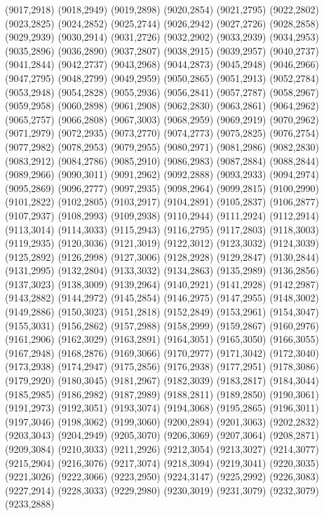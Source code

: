 (9017,2918)
(9018,2949)
(9019,2898)
(9020,2854)
(9021,2795)
(9022,2802)
(9023,2825)
(9024,2852)
(9025,2744)
(9026,2942)
(9027,2726)
(9028,2858)
(9029,2939)
(9030,2914)
(9031,2726)
(9032,2902)
(9033,2939)
(9034,2953)
(9035,2896)
(9036,2890)
(9037,2807)
(9038,2915)
(9039,2957)
(9040,2737)
(9041,2844)
(9042,2737)
(9043,2968)
(9044,2873)
(9045,2948)
(9046,2966)
(9047,2795)
(9048,2799)
(9049,2959)
(9050,2865)
(9051,2913)
(9052,2784)
(9053,2948)
(9054,2828)
(9055,2936)
(9056,2841)
(9057,2787)
(9058,2967)
(9059,2958)
(9060,2898)
(9061,2908)
(9062,2830)
(9063,2861)
(9064,2962)
(9065,2757)
(9066,2808)
(9067,3003)
(9068,2959)
(9069,2919)
(9070,2962)
(9071,2979)
(9072,2935)
(9073,2770)
(9074,2773)
(9075,2825)
(9076,2754)
(9077,2982)
(9078,2953)
(9079,2955)
(9080,2971)
(9081,2986)
(9082,2830)
(9083,2912)
(9084,2786)
(9085,2910)
(9086,2983)
(9087,2884)
(9088,2844)
(9089,2966)
(9090,3011)
(9091,2962)
(9092,2888)
(9093,2933)
(9094,2974)
(9095,2869)
(9096,2777)
(9097,2935)
(9098,2964)
(9099,2815)
(9100,2990)
(9101,2822)
(9102,2805)
(9103,2917)
(9104,2891)
(9105,2837)
(9106,2877)
(9107,2937)
(9108,2993)
(9109,2938)
(9110,2944)
(9111,2924)
(9112,2914)
(9113,3014)
(9114,3033)
(9115,2943)
(9116,2795)
(9117,2803)
(9118,3003)
(9119,2935)
(9120,3036)
(9121,3019)
(9122,3012)
(9123,3032)
(9124,3039)
(9125,2892)
(9126,2998)
(9127,3006)
(9128,2928)
(9129,2847)
(9130,2844)
(9131,2995)
(9132,2804)
(9133,3032)
(9134,2863)
(9135,2989)
(9136,2856)
(9137,3023)
(9138,3009)
(9139,2964)
(9140,2921)
(9141,2928)
(9142,2987)
(9143,2882)
(9144,2972)
(9145,2854)
(9146,2975)
(9147,2955)
(9148,3002)
(9149,2886)
(9150,3023)
(9151,2818)
(9152,2849)
(9153,2961)
(9154,3047)
(9155,3031)
(9156,2862)
(9157,2988)
(9158,2999)
(9159,2867)
(9160,2976)
(9161,2906)
(9162,3029)
(9163,2891)
(9164,3051)
(9165,3050)
(9166,3055)
(9167,2948)
(9168,2876)
(9169,3066)
(9170,2977)
(9171,3042)
(9172,3040)
(9173,2938)
(9174,2947)
(9175,2856)
(9176,2938)
(9177,2951)
(9178,3086)
(9179,2920)
(9180,3045)
(9181,2967)
(9182,3039)
(9183,2817)
(9184,3044)
(9185,2985)
(9186,2982)
(9187,2989)
(9188,2811)
(9189,2850)
(9190,3061)
(9191,2973)
(9192,3051)
(9193,3074)
(9194,3068)
(9195,2865)
(9196,3011)
(9197,3046)
(9198,3062)
(9199,3060)
(9200,2894)
(9201,3063)
(9202,2832)
(9203,3043)
(9204,2949)
(9205,3070)
(9206,3069)
(9207,3064)
(9208,2871)
(9209,3084)
(9210,3033)
(9211,2926)
(9212,3054)
(9213,3027)
(9214,3077)
(9215,2904)
(9216,3076)
(9217,3074)
(9218,3094)
(9219,3041)
(9220,3035)
(9221,3026)
(9222,3066)
(9223,2950)
(9224,3147)
(9225,2992)
(9226,3083)
(9227,2914)
(9228,3033)
(9229,2980)
(9230,3019)
(9231,3079)
(9232,3079)
(9233,2888)
